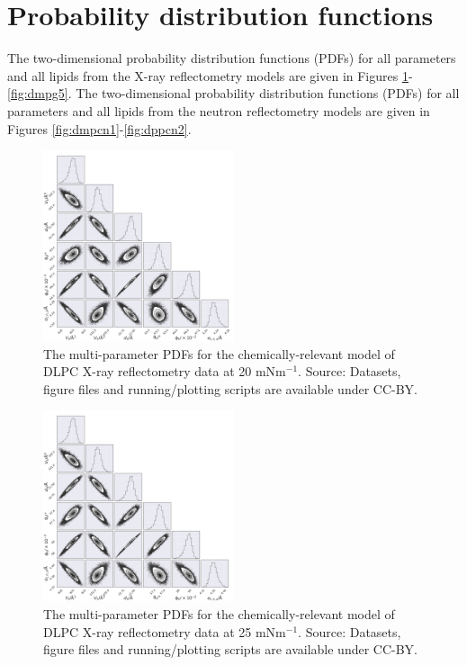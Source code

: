 \documentclass[11pt,a4paper]{article}
\begin{document}
\section{Probability distribution functions}

The two-dimensional probability distribution functions (PDFs) for all parameters and all lipids from the X-ray reflectometry models are given in Figures \ref{fig:dlpc2}-\ref{fig:dmpg5}. The two-dimensional probability distribution functions (PDFs) for all parameters and all lipids from the neutron reflectometry models are given in Figures \ref{fig:dmpcn1}-\ref{fig:dppcn2}.
\begin{figure}[h]
	\centering
	\includegraphics[width=0.50\textwidth]{figures/dlpc2_all_corner}
	\caption{The multi-parameter PDFs for the chemically-relevant model of DLPC X-ray reflectometry data at 20 mNm$^{-1}$. Source: Datasets, figure files and running/plotting scripts are available under CC-BY.\cite{mccluskey_2018}}
	\label{fig:dlpc2}
\end{figure}
\begin{figure}[h]
	\centering
	\includegraphics[width=0.50\textwidth]{figures/dlpc3_all_corner}
	\caption{The multi-parameter PDFs for the chemically-relevant model of DLPC X-ray reflectometry data at 25 mNm$^{-1}$. Source: Datasets, figure files and running/plotting scripts are available under CC-BY.\cite{mccluskey_2018}}
	\label{fig:dlpc3}
\end{figure}
\end{document}
